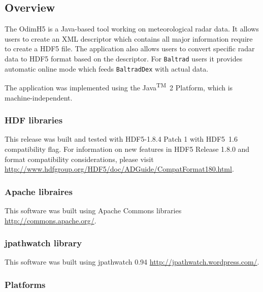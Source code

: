 \documentclass[11p]{article}
\begin{document}
\subsection{Overview}

The OdimH5 is a Java-based tool working on meteorological radar data. It allows
users to create an XML descriptor which contains all major information require to
create a HDF5 file. The application also allows users to convert specific radar
data to HDF5 format based on the descriptor. For \texttt{Baltrad} users it
provides automatic online mode which feeds \texttt{BaltradDex} with actual
data.

The application was implemented using the Java\textsuperscript{TM}~2 Platform,
which is machine-independent.

\subsubsection*{HDF libraries} 

  This release was built and tested with HDF5-1.8.4 Patch 1 with HDF5~1.6
  compatibility flag. For information on new features in HDF5 Release 1.8.0 and
  format compatibility considerations, please visit\\
  \href{http://www.hdfgroup.org/HDF5/doc/ADGuide/CompatFormat180.html}
  {http://www.hdfgroup.org/HDF5/doc/ADGuide/CompatFormat180.html}.

\subsubsection*{Apache libraires}

This software was built using Apache Commons libraries 
\href{http://commons.apache.org/}{http://commons.apache.org/}.

\subsubsection*{jpathwatch library}

This software was built using jpathwatch 0.94 
\href{http://jpathwatch.wordpress.com/}{http://jpathwatch.wordpress.com/}.

\subsubsection*{Platforms}
\end{document}
